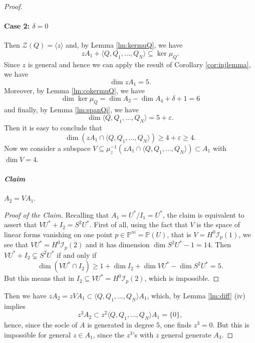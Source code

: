 \documentclass[10pt, a4paper]{amsart}
\theoremstyle{plain}
\theoremstyle{definition}
\theoremstyle{remark}
\def\PP{\mathbb{P}}
\begin{document}
\begin{proof}
\paragraph{\bf Case 2: $\delta=0$} Then $\mathcal{Z}(Q)=\langle z\rangle$ and, by Lemma \ref{lm:kermuQ}, we have 
$$zA_1+\langle Q, Q_1,\ldots,Q_N\rangle\subseteq \ker\mu_Q.$$
 Since $z$ is general and hence we can apply the result of Corollary \ref{cor:injlemma}, we have $$\dim zA_1=5.$$ Moreover, by  Lemma \ref{lm:cokermuQ}, we have $$\dim\ker\mu_Q=\dim A_2-\dim A_4+\delta+1=6$$ and finally, by Lemma  \ref{lm:spanQi}, we have $$\dim \langle Q, Q_1,\ldots,Q_N\rangle=5+\varepsilon.$$
 Then it is easy to conclude that $$\dim  (zA_1\cap\langle Q ,Q_1,\ldots,Q_N\rangle)\geq 4+\varepsilon\geq 4.$$
 Now we consider a subspace $V\subseteq \mu_z^{-1}(zA_1\cap\langle Q ,Q_1,\ldots,Q_N\rangle)\subset A_1$ with $\dim V=4$. 
\vskip2mm
 \paragraph{\em Claim} $A_2=VA_1$.
 \begin{proof}[Proof of the Claim] Recalling that $A_1=U^\ast/I_1=U^\ast$, the claim is equivalent to assert that $VU^\ast+I_2=S^2U^\ast$. First of all, using the fact that $V$ is the space of linear forms vanishing on one point $p\in\PP^m=\PP(U)$, that is $V=H^0\mathcal{I}_p(1)$, we see that $VU^\ast=H^0\mathcal{I}_p(2)$ and it has dimension $\dim S^2U^\ast-1=14$. Then $VU^\ast+I_2\subsetneq S^2U^\ast$ if and only if $$\dim (VU^\ast\cap I_2)\geq 1+ \dim I_2+\dim VU^\ast-\dim S^2U^\ast=5.$$  But this means that in $I_2\subseteq VU^\ast=H^0\mathcal{I}_p(2)$, which is impossible. 
    \end{proof}
Then we have $zA_2=zVA_1 \subset \langle Q, Q_1,\ldots,Q_N\rangle A_1$, which, by Lemma \ref{lm:diff}  (iv) implies $$z^3A_2 \subset z^2\langle Q, Q_1,\ldots,Q_N\rangle A_1=\{0\},$$ hence, since the socle of $A$ is generated in degree $5$, one finds $z^3=0$. But this is impossible for general $z\in A_1$, since the $z^3$'s with $z$ general generate $A_3$.
 \end{proof}
\end{document}

